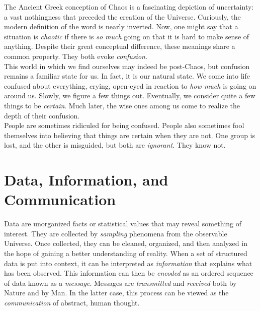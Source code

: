 The Ancient Greek conception of Chaos is a fascinating depiction of uncertainty: a vast nothingness that preceded the creation of the Universe. Curiously, the modern definition of the word is nearly inverted. Now, one might say that a situation is \textit{chaotic} if there is \textit{so much} going on that it is hard to make sense of anything. Despite their great conceptual difference, these meanings share a common property. They both evoke \textit{confusion}. \\

This world in which we find ourselves may indeed be post-Chaos, but confusion remains a familiar state for us. In fact, it is our natural state. We come into life confused about everything, crying, open-eyed in reaction to \textit{how much} is going on around us. Slowly, we figure a few things out. Eventually, we consider quite a few things to be \textit{certain}. Much later, the wise ones among us come to realize the depth of their confusion. \\

People are sometimes ridiculed for being confused. People also sometimes fool themselves into believing that things are certain when they are not. One group is lost, and the other is misguided, but both are \textit{ignorant}. They know not. \\



\toclineskip
\section{Data, Information, and Communication}

Data are unorganized facts or statistical values that may reveal something of interest. They are collected by \textit{sampling} phenomena from the observable Universe. Once collected, they can be cleaned, organized, and then analyzed in the hope of gaining a better understanding of reality. When a set of structured data is put into context, it can be interpreted as \textit{information} that explains what has been observed. This information can then be \textit{encoded} as an ordered sequence of data known as a \textit{message}. Messages are \textit{transmitted} and \textit{received} both by Nature and by Man. In the latter case, this process can be viewed as the \textit{communication} of abstract, human thought. \\

